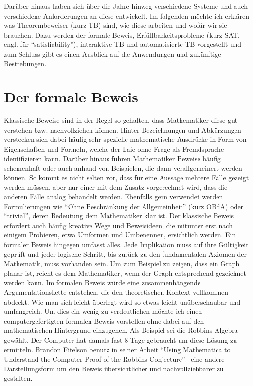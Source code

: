Darüber hinaus haben sich über die Jahre hinweg verschiedene Systeme und auch verschiedene Anforderungen an diese entwickelt.
Im folgenden möchte ich erklären was Theorembeweiser (kurz TB) sind, wie diese arbeiten und wofür wir sie brauchen.
Dazu werden der formale Beweis, Erfüllbarkeitsprobleme (kurz SAT, engl. für \enquote{satisfiability}), interaktive TB und automatisierte TB vorgestellt und zum Schluss gibt es einen Ausblick auf die Anwendungen und zukünftige Bestrebungen.

\section{Der formale Beweis}
Klassische Beweise sind in der Regel so gehalten, dass Mathematiker diese gut
verstehen bzw. nachvollziehen können. Hinter Bezeichnungen und Abkürzungen
verstecken sich dabei häufig sehr spezielle mathematische Ausdrücke in Form von
Eigenschaften und Formeln, welche der Laie ohne Frage als Fremdsprache
identifizieren kann. Darüber hinaus führen Mathematiker Beweise häufig
schemenhaft oder auch anhand von Beispielen, die dann verallgemeinert werden
können. So kommt es nicht selten vor, dass für eine Aussage mehrere Fälle gezeigt
werden müssen, aber nur einer mit dem Zusatz vorgerechnet wird, dass die anderen
Fälle analog behandelt werden. Ebenfalls gern verwendet werden Formulierungen wie
\enquote{Ohne Beschränkung der Allgemeinheit} (kurz OBdA) oder \enquote{trivial}, deren
Bedeutung dem Mathematiker klar ist. Der klassische Beweis erfordert auch häufig
kreative Wege und Beweisideen, die mitunter erst nach einigem Probieren, etwa
Umformen und Umbenennen, ersichtlich werden. Ein formaler Beweis hingegen
umfasst alles. Jede Implikation muss auf ihre Gültigkeit geprüft und jeder logische
Schritt, bis zurück zu den fundamentalen Axiomen der Mathematik, muss vorhanden
sein. Um zum Beispiel zu zeigen, dass ein Graph planar ist, reicht es dem
Mathematiker, wenn der Graph entsprechend gezeichnet werden kann. Im formalen
Beweis würde eine zusammenhängende Argumentationskette entstehen, die den
theoretischen Kontext vollkommen abdeckt. Wie man sich leicht überlegt wird so
etwas leicht unüberschaubar und umfangreich. Um dies ein wenig zu verdeutlichen
möchte ich einen computergefertigten formalen Beweis vorstellen ohne dabei auf den
mathematischen Hintergrund einzugehen.
Als Beispiel sei die Robbins Algebra gewählt. Der Computer hat damals fast 8 Tage gebraucht um diese Lösung zu ermitteln. Brandon Fitelson benutz in seiner Arbeit \enquote{Using Mathematica to Understand the Computer Proof of the Robbins Conjecture}~\cite{robinsconjecture} eine andere Darstellungsform um den Beweis übersichtlicher und nachvollziehbarer zu gestalten.
